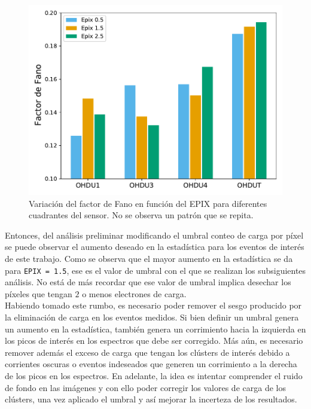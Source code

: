 \begin{figure}[h]
    \centering
    \includegraphics[scale=0.5]{Figs/Fano_vs_Epix.pdf}
    \caption{\footnotesize{Variación del factor de Fano en función del EPIX para diferentes cuadrantes del sensor. No se observa un patrón que se repita.}}
    \label{fig:FanoVsEpix}
\end{figure}
Entonces, del análisis preliminar modificando el umbral conteo de carga por píxel se puede observar el aumento deseado en la estadística para los eventos de interés de este trabajo. Como se observa que el mayor aumento en la estadística se da para \verb|EPIX = 1.5|, ese es el valor de umbral con el que se realizan los subsiguientes análisis. No está de más recordar que ese valor de umbral implica desechar los píxeles que tengan $2$ o menos electrones de carga.\\
\indent Habiendo tomado este rumbo, es necesario poder remover el sesgo producido por la eliminación de carga en los eventos medidos. Si bien definir un umbral genera un aumento en la estadística, también genera un corrimiento hacia la izquierda en los picos de interés en los espectros que debe ser corregido. Más aún, es necesario remover además el exceso de carga que tengan los clústers de interés debido a corrientes oscuras o eventos indeseados que generen un corrimiento a la derecha de los picos en los espectros. En adelante, la idea es intentar comprender el ruido de fondo en las imágenes y con ello poder corregir los valores de carga de los clústers, una vez aplicado el umbral y así mejorar la incerteza de los resultados.

